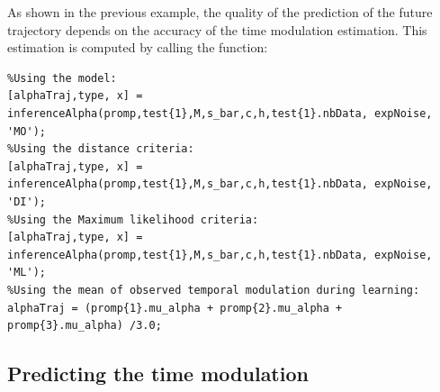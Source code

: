 \documentclass[utf8]{frontiersSCNS} %
\newcommand{\todo}[1]{\textcolor{red}{\textbf{/*#1*/}}}
\begin{document}

As shown in the previous example, the quality of the prediction of the future trajectory depends on the accuracy of the time modulation estimation. This estimation is computed by calling the function: 
\begin{lstlisting}
%Using the model:
[alphaTraj,type, x] = inferenceAlpha(promp,test{1},M,s_bar,c,h,test{1}.nbData, expNoise, 'MO');
%Using the distance criteria:
[alphaTraj,type, x] = inferenceAlpha(promp,test{1},M,s_bar,c,h,test{1}.nbData, expNoise, 'DI');
%Using the Maximum likelihood criteria:
[alphaTraj,type, x] = inferenceAlpha(promp,test{1},M,s_bar,c,h,test{1}.nbData, expNoise, 'ML');
%Using the mean of observed temporal modulation during learning:
alphaTraj = (promp{1}.mu_alpha + promp{2}.mu_alpha + promp{3}.mu_alpha) /3.0;  
\end{lstlisting}


\subsection{Predicting the time modulation}\label{sec:simulatedTimeModulationModels}
\end{document}
